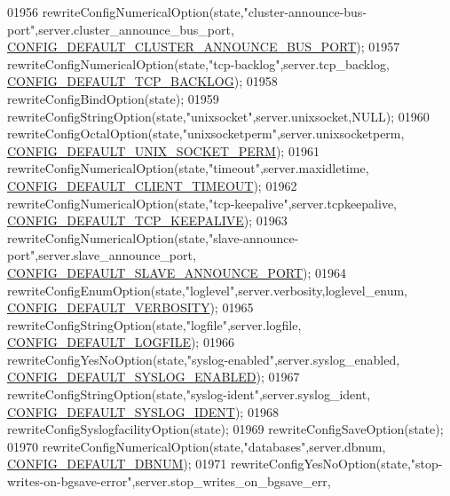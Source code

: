 \begin{DoxyCode}
{{{{{{{{{{{{{{{{{{{{{{{{{{{{01956     rewriteConfigNumericalOption(state,\textcolor{stringliteral}{"cluster-announce-bus-port"},server.cluster\_announce\_bus\_port,
      \hyperlink{server_8h_a86d6a82bc81e718079728c3cb6c8c5b4}{CONFIG\_DEFAULT\_CLUSTER\_ANNOUNCE\_BUS\_PORT});
01957     rewriteConfigNumericalOption(state,\textcolor{stringliteral}{"tcp-backlog"},server.tcp\_backlog,
      \hyperlink{server_8h_ab85c155ec2652313a561af139fdb5575}{CONFIG\_DEFAULT\_TCP\_BACKLOG});
01958     rewriteConfigBindOption(state);
01959     rewriteConfigStringOption(state,\textcolor{stringliteral}{"unixsocket"},server.unixsocket,NULL);
01960     rewriteConfigOctalOption(state,\textcolor{stringliteral}{"unixsocketperm"},server.unixsocketperm,
      \hyperlink{server_8h_a486eb6d6b0e44a772877112dbd928494}{CONFIG\_DEFAULT\_UNIX\_SOCKET\_PERM});
01961     rewriteConfigNumericalOption(state,\textcolor{stringliteral}{"timeout"},server.maxidletime,
      \hyperlink{server_8h_a1d6ca2cad092805de3acd7b74876a323}{CONFIG\_DEFAULT\_CLIENT\_TIMEOUT});
01962     rewriteConfigNumericalOption(state,\textcolor{stringliteral}{"tcp-keepalive"},server.tcpkeepalive,
      \hyperlink{server_8h_a2c8d2290c3ac70d63ed2e62b11ab566b}{CONFIG\_DEFAULT\_TCP\_KEEPALIVE});
01963     rewriteConfigNumericalOption(state,\textcolor{stringliteral}{"slave-announce-port"},server.slave\_announce\_port,
      \hyperlink{server_8h_ac8ad217da6cfbdf399948aff4d3550ca}{CONFIG\_DEFAULT\_SLAVE\_ANNOUNCE\_PORT});
01964     rewriteConfigEnumOption(state,\textcolor{stringliteral}{"loglevel"},server.verbosity,loglevel\_enum,
      \hyperlink{server_8h_a407337e4d193cc8fc965938b7a247240}{CONFIG\_DEFAULT\_VERBOSITY});
01965     rewriteConfigStringOption(state,\textcolor{stringliteral}{"logfile"},server.logfile,
      \hyperlink{server_8h_a0698b50ff7fe51afd74cf20a72b75e1b}{CONFIG\_DEFAULT\_LOGFILE});
01966     rewriteConfigYesNoOption(state,\textcolor{stringliteral}{"syslog-enabled"},server.syslog\_enabled,
      \hyperlink{server_8h_a22c57e53d530d95ae346f13d6781a549}{CONFIG\_DEFAULT\_SYSLOG\_ENABLED});
01967     rewriteConfigStringOption(state,\textcolor{stringliteral}{"syslog-ident"},server.syslog\_ident,
      \hyperlink{server_8h_ac7414291a371fd3a2bad4d34e13f0d77}{CONFIG\_DEFAULT\_SYSLOG\_IDENT});
01968     rewriteConfigSyslogfacilityOption(state);
01969     rewriteConfigSaveOption(state);
01970     rewriteConfigNumericalOption(state,\textcolor{stringliteral}{"databases"},server.dbnum,
      \hyperlink{server_8h_abc5ff12d4e9b662f85d2cb11a0220926}{CONFIG\_DEFAULT\_DBNUM});
01971     rewriteConfigYesNoOption(state,\textcolor{stringliteral}{"stop-writes-on-bgsave-error"},server.stop\_writes\_on\_bgsave\_err,
}}}}}}}}}}}}}}}}}}}}}}}}}}}}
\end{DoxyCode}
